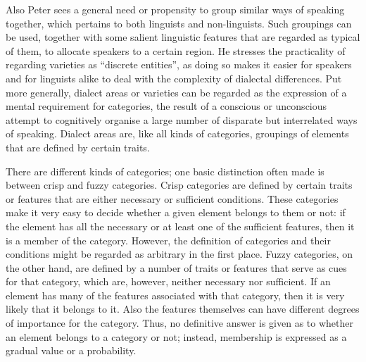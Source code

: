 \documentclass[output=paper]{LSP/langsci}
\begin{document}
Also Peter \citet[807]{wiesinger_einteilung_1983} sees a general need or propensity to group similar ways of speaking together, which pertains to both linguists and non-linguists. Such groupings can be used, together with some salient linguistic features that are regarded as typical of them, to allocate speakers to a certain region. He stresses the practicality of regarding varieties as “discrete entities”, as doing so makes it easier for speakers and for linguists alike to deal with the complexity of dialectal differences. Put more generally, dialect areas or varieties can be regarded as the expression of a mental requirement for categories, the result of a conscious or unconscious attempt to cognitively organise a large number of disparate but interrelated ways of speaking. Dialect areas are, like all kinds of categories, groupings of elements that are defined by certain traits.

There are different kinds of categories; one basic distinction often made is between crisp and fuzzy categories. Crisp categories are defined by certain traits or features that are either necessary or sufficient conditions. These categories make it very easy to decide whether a given element belongs to them or not: if the element has all the necessary or at least one of the sufficient features, then it is a member of the category. However, the definition of categories and their conditions might be regarded as arbitrary in the first place. Fuzzy categories, on the other hand, are defined by a number of traits or features that serve as cues for that category, which are, however, neither necessary nor sufficient. If an element has many of the features associated with that category, then it is very likely that it belongs to it. Also the features themselves can have different degrees of importance for the category. Thus, no definitive answer is given as to whether an element belongs to a category or not; instead, membership is expressed as a gradual value or a probability. 
\end{document}
